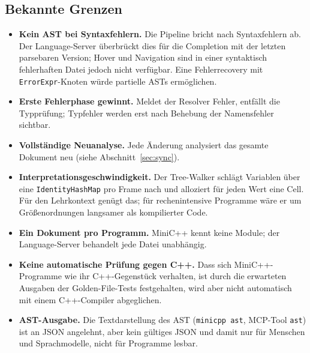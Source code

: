 \documentclass[11pt,a4paper,parskip=half,headsepline,toc=flat]{scrartcl}
\newcommand{\code}[1]{\texttt{#1}}
\begin{document}
\subsection{Bekannte Grenzen}
\begin{itemize}
  \item \textbf{Kein AST bei Syntaxfehlern.} Die Pipeline bricht nach Syntaxfehlern ab. Der Language-Server
    überbrückt dies für die Completion mit der letzten parsebaren Version; Hover und Navigation sind in einer
    syntaktisch fehlerhaften Datei jedoch nicht verfügbar. Eine Fehlerrecovery mit \code{ErrorExpr}-Knoten würde
    partielle ASTs ermöglichen.
  \item \textbf{Erste Fehlerphase gewinnt.} Meldet der Resolver Fehler, entfällt die Typprüfung; Typfehler werden
    erst nach Behebung der Namensfehler sichtbar.
  \item \textbf{Vollständige Neuanalyse.} Jede Änderung analysiert das gesamte Dokument neu (siehe
    Abschnitt~\ref{sec:sync}).
  \item \textbf{Interpretationsgeschwindigkeit.} Der Tree-Walker schlägt Variablen über eine
    \code{IdentityHashMap} pro Frame nach und alloziert für jeden Wert eine Cell. Für den Lehrkontext genügt das;
    für rechenintensive Programme wäre er um Größenordnungen langsamer als kompilierter Code.
  \item \textbf{Ein Dokument pro Programm.} MiniC++ kennt keine Module; der Language-Server behandelt jede Datei
    unabhängig.
  \item \textbf{Keine automatische Prüfung gegen C++.} Dass sich MiniC++-Programme wie ihr C++-Gegenstück verhalten,
    ist durch die erwarteten Ausgaben der Golden-File-Tests festgehalten, wird aber nicht automatisch mit einem
    C++-Compiler abgeglichen.
  \item \textbf{AST-Ausgabe.} Die Textdarstellung des AST (\code{minicpp ast}, MCP-Tool \code{ast}) ist an JSON
    angelehnt, aber kein gültiges JSON und damit nur für Menschen und Sprachmodelle, nicht für Programme lesbar.
\end{itemize}
\end{document}
